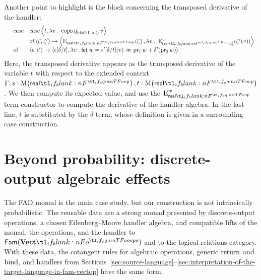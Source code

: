 \documentclass[11pt,a4paper]{article}
\theoremstyle{definition}
\theoremstyle{remark}
\providecommand{\Fam}[1]{\mathsf{Fam}(#1)}
\providecommand{\casubst}[3]{#1[#3/#2]}
\providecommand{\letst}[3]{\mathsf{let}\;#1=#2\;\mathsf{in}\;#3}
\begin{document}
Another point to highlight is the block concerning the transposed derivative of the handler:
\begin{equation*}
  \begin{array}{lll}
    &
      \opn[b]{case}
    &
      \opn[b]{case}
      \tuple{ t, \lambda v \; . \; \opn[b]{coproj}_{\fn[n]{ \opn{idx} }{ t; \Gamma, s, t }} v}
    \\
    &
    &
      \opn[b]{of} \tuple{ \zeta, \zeta' } \to
      \tuple{
      \fn[n]{ \opn[b]{E}_{\srcreal} }{ \zeta },
      \lambda v \; . \;
      \fn[n]{ \opn[b]{E}_{\srcreal, \zeta}^{w} }{ \fn[n]{ \zeta' }{ v } }
      }
    \\
    &
      \opn[b]{of}
    &\tuple{ \epsilon, \epsilon' }
      \to
      \tuple{
      \casubst{\epsilon}{t}{\delta},
      \lambda v \; . \;
      \letst{w}{
      \fn[n]{ \casubst{\epsilon'}{t}{\delta} }{ v }
      }{
      \opn[b]{pr}_{1} w + \fn[n]{ \delta' }{ \opn[b]{pr}_{2} w }
      }
      }
  \end{array}
\end{equation*}
Here, the transposed derivative appears as the transposed derivative of the variable \( t \) with respect to the extended context \( \Gamma, s : \Fun[nn]{ \opn[b]{M} }{ \srcreal }, t : \Fun[nn]{ \opn[b]{M} }{ \srcreal } \). We then compute its expected value, and use the \( \opn[b]{E}^{w}_{\srcreal} \) term constructor to compute the derivative of the handler algebra. In the last line, \( t \) is substituted by the \( \delta \) term, whose definition is given in a surrounding case construction.

\section{Beyond probability: discrete-output algebraic effects}
\label{sec:beyond-probability}

The FAD monad is the main case study, but our construction is not intrinsically probabilistic. The reusable data are a strong monad presented by discrete-output operations, a chosen Eilenberg--Moore handler algebra, and compatible lifts of the monad, the operations, and the handler to \( \Fam{\Vect[o]} \) and to the logical-relations category. With these data, the cotangent rules for algebraic operations, generic \( \opn[b]{return} \) and \( \opn[b]{bind} \), and handlers from Sections~\ref{sec:source-language}--\ref{sec:interpretation-of-the-target-language-in-fam-vectop} have the same form.
\end{document}
